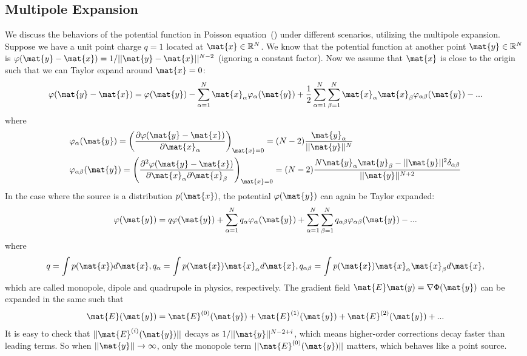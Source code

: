 \subsection{Multipole Expansion}
\label{sec:mul}
We discuss the behaviors of the potential function in Poisson equation~() under different scenarios, utilizing the multipole expansion. Suppose we have a unit point charge $q=1$ located at $\mat{x}\in\mathbb{R}^N$. We know that the potential function at another point $\mat{y}\in\mathbb{R}^N$ is $\varphi(\mat{y}-\mat{x})=1/||\mat{y}-\mat{x}||^{N-2}$ (ignoring a constant factor). Now we assume that $\mat{x}$ is close to the origin such that we can Taylor expand around $\mat{x}=0$:
\begin{equation}
    \varphi(\mat{y}-\mat{x})= \varphi(\mat{y}) - \sum_{\alpha=1}^N \mat{x}_\alpha \varphi_\alpha(\mat{y})+\frac{1}{2}\sum_{\alpha=1}^N\sum_{\beta=1}^N \mat{x}_\alpha\mat{x}_\beta \varphi_{\alpha\beta}(\mat{y})-...
\end{equation}
where
\begin{equation}
\begin{aligned}
    &\varphi_\alpha(\mat{y})=\left(\frac{\partial \varphi(\mat{y}-\mat{x})}{\partial \mat{x}_\alpha}\right)_{\mat{x}=0}=(N-2)\frac{\mat{y}_\alpha}{||\mat{y}||^{N}} \\ &\varphi_{\alpha\beta}(\mat{y})=\left(\frac{\partial^2 \varphi(\mat{y}-\mat{x})}{\partial \mat{x}_\alpha\partial \mat{x}_\beta}\right)_{\mat{x}=0}=(N-2)\frac{N\mat{y}_\alpha\mat{y}_\beta-||\mat{y}||^2\delta_{\alpha\beta}}{||\mat{y}||^{N+2}}
\end{aligned}
\end{equation}
In the case where the source is a distribution $p(\mat{x})$, the potential $\varphi(\mat{y})$ can again be Taylor expanded:
\begin{equation}
        \varphi(\mat{y}) = q\varphi(\mat{y}) + \sum_{\alpha=1}^ Nq_\alpha\varphi_\alpha (\mat{y}) + \sum_{\alpha=1}^N\sum_{\beta=1}^N q_{\alpha\beta}\varphi_{\alpha\beta}(\mat{y}) -...
\end{equation}
where 
\begin{equation}
    q = \int p(\mat{x})d\mat{x}, q_\alpha = \int p(\mat{x})\mat{x}_\alpha d\mat{x}, q_{\alpha\beta} = \int p(\mat{x})\mat{x}_\alpha\mat{x}_\beta d\mat{x},
\end{equation}
which are called monopole, dipole and quadrupole in physics, respectively. The gradient field $\mat{E}\mat(y)=\nabla\Phi(\mat{y})$ can be expanded in the same such that
\begin{equation}
    \mat{E}(\mat{y}) = \mat{E}^{(0)}(\mat{y})+\mat{E}^{(1)}(\mat{y})+\mat{E}^{(2)}(\mat{y})+...
\end{equation}
It is easy to check that $||\mat{E}^{(i)}(\mat{y})||$ decays as $1/||\mat{y}||^{N-2+i}$, which means higher-order corrections decay faster than leading terms. So when $||\mat{y}||\to \infty$, only the monopole term $||\mat{E}^{(0)}(\mat{y})||$ matters, which behaves like a point source.

